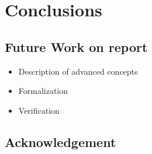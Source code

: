 \chapter{Conclusions}

\section{Future Work on report}
\begin{itemize}
  \item Description of advanced concepts
  \item Formalization
  \item Verification
\end{itemize}

\section*{Acknowledgement}